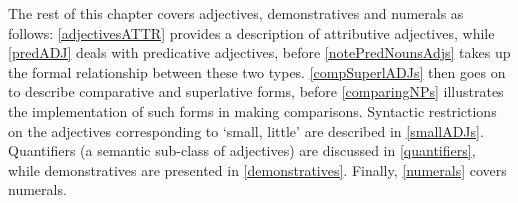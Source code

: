 The rest of this chapter covers adjectives, demonstratives and numerals as follows: \SEC\ref{adjectivesATTR} provides a description of attributive adjectives, %
while \SEC\ref{predADJ} deals with predicative adjectives, before \SEC\ref{notePredNounsAdjs} takes up the formal relationship between these two types. 
\SEC\ref{compSuperlADJs} then goes on to describe comparative and superlative forms, 
before \SEC\ref{comparingNPs} illustrates the implementation of such forms in making comparisons. 
Syntactic restrictions on the adjectives corresponding to ‘small, little’ are described in \SEC\ref{smallADJs}. 
Quantifiers (a semantic sub-class of adjectives) are discussed in \SEC\ref{quantifiers}, while 
demonstratives are presented in \SEC\ref{demonstratives}. 
Finally, \SEC\ref{numerals} covers numerals. %





